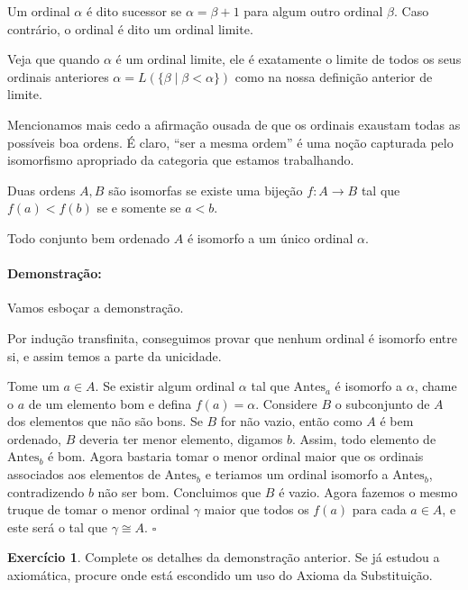 \documentclass[11pt]{article}
\newcommand{\pulinho}{\vspace{.5cm}}
\newcommand{\luamedio}{
\emoji{first-quarter-moon}
}
\theoremstyle{definition}
\theoremstyle{definition}
\newtheorem*{theorem*}{Teorema}
\newenvironment{teorema*}{
\definecolor{shadecolor}{HTML}{f59aa3}
\begin{shaded}
\begin{theorem*}
}
{
\end{theorem*}
\end{shaded}
}
\theoremstyle{definition}
\theoremstyle{definition}
\theoremstyle{definition}
\theoremstyle{definition}
\theoremstyle{definition}
\theoremstyle{definition}
\newtheorem*{definition*}{Definição}
\newenvironment{definicao*}{
\definecolor{shadecolor}{HTML}{defcfc}
\begin{shaded}
\begin{definition*}
}
{
\end{definition*}
\end{shaded}
}
\theoremstyle{definition}
\theoremstyle{definition}
\theoremstyle{definition}
\theoremstyle{definition}
\newenvironment{prova}{\paragraph{Demonstração:}}{\hfill$\square$ 
\pulinho
}
\theoremstyle{definition}
\newtheorem{exersisio}{Exercício}
\newenvironment{exercicio}{
\definecolor{shadecolor}{HTML}{CFB5FF}
\begin{shaded}
\begin{exersisio}
}
{
\end{exersisio}
\end{shaded}
}
\begin{document}
\begin{definicao*}
  Um ordinal $\alpha$ é dito sucessor se $\alpha = \beta + 1$ para algum outro ordinal $\beta$. Caso contrário, o ordinal é dito um ordinal limite.
\end{definicao*}

Veja que quando $\alpha$ é um ordinal limite, ele é exatamente o limite de todos os seus ordinais anteriores $\alpha = L(\{\beta \mid \beta < \alpha\})$ como na nossa definição anterior de limite.

Mencionamos mais cedo a afirmação ousada de que os ordinais exaustam todas as possíveis boa ordens. É claro, ``ser a mesma ordem'' é uma noção capturada pelo isomorfismo apropriado da categoria que estamos trabalhando.

\begin{definicao*}
Duas ordens $A,B$ são isomorfas se existe uma bijeção $f:A \rightarrow B$ tal que $f(a) < f(b)$ se e somente se $a < b$.
\end{definicao*}

\begin{teorema*}
  Todo conjunto bem ordenado $A$ é isomorfo a um único ordinal $\alpha$.
\end{teorema*}
\begin{prova}
Vamos esboçar a demonstração.

Por indução transfinita, conseguimos provar que nenhum ordinal é isomorfo entre si, e assim temos a parte da unicidade.

Tome um $a \in A$. Se existir algum ordinal $\alpha$ tal que $\text{Antes}_a$ é isomorfo a $\alpha$, chame o $a$ de um elemento bom e defina $f(a) = \alpha$. Considere $B$ o subconjunto de $A$ dos elementos que não são bons. Se $B$ for não vazio, então como $A$ é bem ordenado, $B$ deveria ter menor elemento, digamos $b$. Assim, todo elemento de $\text{Antes}_b$ é bom. Agora bastaria tomar o menor ordinal maior que os ordinais associados aos elementos de $\text{Antes}_b$ e teriamos um ordinal isomorfo a $\text{Antes}_b$, contradizendo $b$ não ser bom. Concluimos que $B$ é vazio. Agora fazemos o mesmo truque de tomar o menor ordinal $\gamma$ maior que todos os $f(a)$ para cada $a \in A$, e este será o tal que $\gamma \cong A$.
\end{prova}

\begin{exercicio}
  \luamedio Complete os detalhes da demonstração anterior. Se já estudou a axiomática, procure onde está escondido um uso do Axioma da Substituição.
\end{exercicio}
\end{document}
